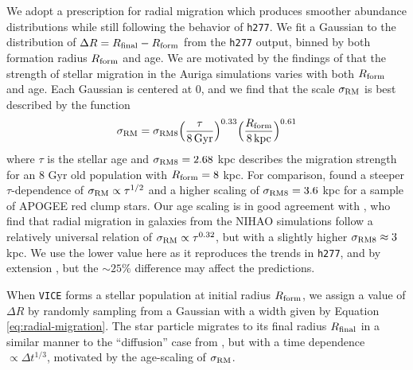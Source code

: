 \documentclass[twocolumn,twocolappendix,linenumbers]{aastex631}
\newcommand{\vice}{{\tt VICE}\xspace}
\newcommand{\hydro}{{\tt h277}\xspace}
\begin{document}
We adopt a prescription for radial migration which produces smoother abundance distributions while still following the behavior of \hydro. We fit a Gaussian to the distribution of $\Delta R = R_{\rm final} - R_{\rm form}$ from the \hydro output, binned by both formation radius $R_{\rm form}$ and age. We are motivated by the findings of \citet{Okalidis2022-AurigaMigration} that the strength of stellar migration in the Auriga simulations \citep{Grand2017-AurigaSims} varies with both $R_{\rm form}$ and age. Each Gaussian is centered at 0, and we find that the scale $\sigma_{\rm RM}$ is best described by the function
\begin{equation}
    \sigma_{\rm RM} = \sigma_{\rm RM8} \Big(\frac{\tau}{8\,{\rm Gyr}}\Big)^{0.33} \Big(\frac{R_{\rm form}}{8\,{\rm kpc}}\Big)^{0.61}
    \label{eq:radial-migration}
\end{equation}
where $\tau$ is the stellar age and $\sigma_{\rm RM8}=2.68$ kpc describes the migration strength for an 8 Gyr old population with $R_{\rm form}=8$ kpc. 
For comparison, \citet{Frankel2018-RadialMigration} found a steeper $\tau$-dependence of $\sigma_{\rm RM}\propto \tau^{1/2}$ and a higher scaling of $\sigma_{\rm RM8}=3.6$ kpc for a sample of APOGEE red clump stars.
Our age scaling is in good agreement with \citet{Lu2023-LMCStars}, who find that radial migration in galaxies from the NIHAO simulations \citep{Wang2015-NIHAOSims} follow a relatively universal relation of $\sigma_{\rm RM}\propto\tau^{0.32}$, but with a slightly higher $\sigma_{\rm RM8}\approx3$ kpc. We use the lower value here as it reproduces the trends in \hydro, and by extension , but the $\sim25\%$ difference may affect the predictions.

When \vice forms a stellar population at initial radius $R_{\rm form}$, we assign a value of $\Delta R$ by randomly sampling from a Gaussian with a width given by Equation \ref{eq:radial-migration}. The star particle migrates to its final radius $R_{\rm final}$ in a similar manner to the ``diffusion'' case from , but with a time dependence $\propto \Delta t^{1/3}$, motivated by the age-scaling of $\sigma_{\rm RM}$.
\end{document}
